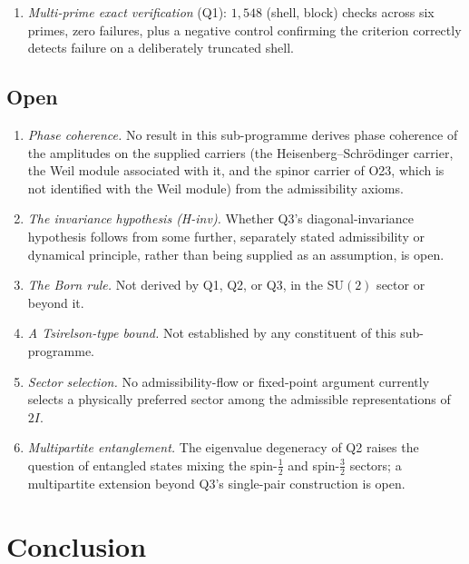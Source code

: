 \documentclass[11pt,a4paper]{article}
\theoremstyle{definition}
\newcommand{\SU}{\mathrm{SU}}
\newcommand{\twoI}{2I}
\begin{document}
      \begin{enumerate}
        \item \textit{Multi-prime exact verification} (Q1): $1{,}548$ (shell, block) checks
        across six primes, zero failures, plus a negative control confirming the criterion
        correctly detects failure on a deliberately truncated shell.
      \end{enumerate}

    \subsection{Open}
      \label{sec:open-hyp}

      \begin{enumerate}
        \item \textit{Phase coherence.} No result in this sub-programme derives phase coherence
        of the amplitudes on the supplied carriers (the Heisenberg--Schr\"odinger carrier, the Weil module
        associated with it, and the spinor carrier of O23, which is not identified with the Weil module) from
        the admissibility axioms.
        \item \textit{The invariance hypothesis (H-inv).} Whether Q3's diagonal-invariance
        hypothesis follows from some further, separately stated admissibility or dynamical
        principle, rather than being supplied as an assumption, is open.
        \item \textit{The Born rule.} Not derived by Q1, Q2, or Q3, in the $\SU(2)$ sector or
        beyond it.
        \item \textit{A Tsirelson-type bound.} Not established by any constituent of this
        sub-programme.
        \item \textit{Sector selection.} No admissibility-flow or fixed-point argument
        currently selects a physically preferred sector among the admissible representations of
        $\twoI$.
        \item \textit{Multipartite entanglement.} The eigenvalue degeneracy of Q2 raises the
        question of entangled states mixing the spin-$\tfrac12$ and spin-$\tfrac32$ sectors; a
        multipartite extension beyond Q3's single-pair construction is open.
      \end{enumerate}

  \section{Conclusion}
    \label{sec:conclusion}
\end{document}
